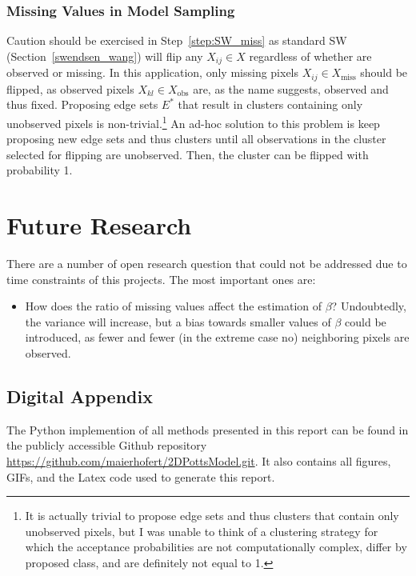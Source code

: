 \documentclass[12pt, twoside]{article}
\newcommand{\1}{\mathbb{1}}
\begin{document}
\subsubsection{Missing Values in Model Sampling}
Caution should be exercised in Step~\ref{step:SW_miss} as standard SW (Section~\ref{swendsen_wang}) will flip any $X_{ij} \in X$ regardless of whether are observed or missing. In this application, only missing pixels $X_{ij} \in X_\text{miss}$ should be flipped, as observed pixels $X_{kl} \in X_\text{obs}$ are, as the name suggests, observed and thus fixed. 
Proposing edge sets $E^*$ that result in clusters containing only unobserved pixels is non-trivial.\footnote{It is actually trivial to propose edge sets and thus clusters that contain only unobserved pixels, but I was unable to think of a clustering strategy for which the acceptance probabilities are not computationally complex, differ by proposed class, and are definitely not equal to 1.} 
An ad-hoc solution to this problem is keep proposing new edge sets and thus clusters until all observations in the cluster selected for flipping are unobserved. Then, the cluster can be flipped with probability 1.

\clearpage
\section{Future Research}\label{future_research}
There are a number of open research question that could not be addressed due to time constraints of this projects. The most important ones are:
\begin{itemize}
    \item How does the ratio of missing values affect the estimation of $\beta$? Undoubtedly, the variance will increase, but a bias towards smaller values of $\beta$ could be introduced, as fewer and fewer (in the extreme case no) neighboring pixels are observed.
\end{itemize}

\clearpage
 
{}


\clearpage
\begin{appendix}
\appendix
\section*{Digital Appendix}
The Python implemention of all methods presented in this report can be found in the publicly accessible Github repository \url{https://github.com/maierhofert/2DPottsModel.git}. 
It also contains all figures, GIFs, and the Latex code used to generate this report.
\end{appendix}
\end{document}
